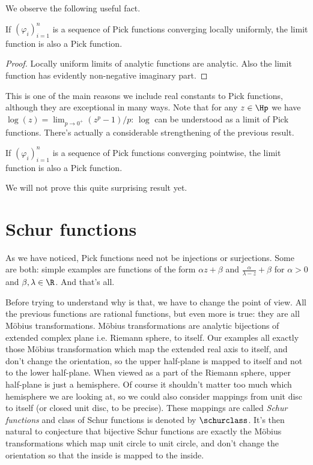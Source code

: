 We observe the following useful fact.

\begin{prop}
	If $(\varphi_{i})_{i = 1}^{n}$ is a sequence of Pick functions converging locally uniformly, the limit function is also a Pick function.
\end{prop}
\begin{proof}
	Locally uniform limits of analytic functions are analytic. Also the limit function has evidently non-negative imaginary part.
\end{proof}

This is one of the main reasons we include real constants to Pick functions, although they are exceptional in many ways. Note that for any $z \in \Hp$ we have $\log(z) = \lim_{p \to 0^{+}}(z^p - 1)/p$: $\log$ can be understood as a limit of Pick functions. There's actually a considerable strengthening of the previous result.

\begin{prop}
	If $(\varphi_{i})_{i = 1}^{n}$ is a sequence of Pick functions converging pointwise, the limit function is also a Pick function.
\end{prop}

We will not prove this quite surprising result yet.

\section{Schur functions}

As we have noticed, Pick functions need not be injections or surjections. Some are both: simple examples are functions of the form $\alpha z + \beta$ and $\frac{\alpha}{\lambda - z} + \beta$ for $\alpha > 0$ and $\beta, \lambda \in \R$. And that's all.

Before trying to understand why is that, we have to change the point of view. All the previous functions are rational functions, but even more is true: they are all Möbius transformations. Möbius transformations are analytic bijections of extended complex plane i.e. Riemann sphere, to itself. Our examples all exactly those Möbius transformation which map the extended real axis to itself, and don't change the orientation, so the upper half-plane is mapped to itself and not to the lower half-plane. When viewed as a part of the Riemann sphere, upper half-plane is just a hemisphere. Of course it shouldn't matter too much which hemisphere we are looking at, so we could also consider mappings from unit disc to itself (or closed unit disc, to be precise). These mappings are called \textit{Schur functions} and class of Schur functions is denoted by $\schurclass$. It's then natural to conjecture that bijective Schur functions are exactly the Möbius transformations which map unit circle to unit circle, and don't change the orientation so that the inside is mapped to the inside.

